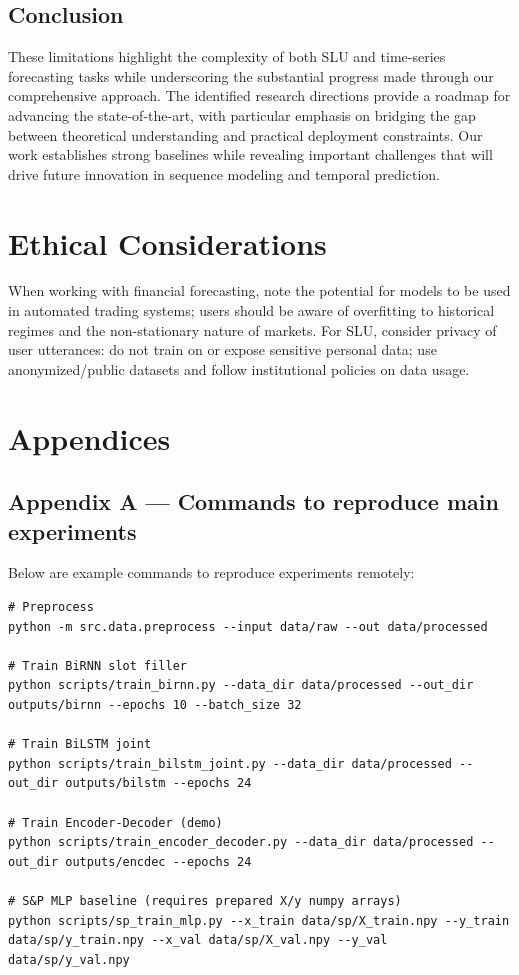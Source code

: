 \documentclass[conference]{IEEEtran}
\begin{document}
\subsection{Conclusion}

These limitations highlight the complexity of both SLU and time-series forecasting tasks while underscoring the substantial progress made through our comprehensive approach. The identified research directions provide a roadmap for advancing the state-of-the-art, with particular emphasis on bridging the gap between theoretical understanding and practical deployment constraints. Our work establishes strong baselines while revealing important challenges that will drive future innovation in sequence modeling and temporal prediction.

\section{Ethical Considerations}
When working with financial forecasting, note the potential for models to be used in automated trading systems; users should be aware of overfitting to historical regimes and the non-stationary nature of markets. For SLU, consider privacy of user utterances: do not train on or expose sensitive personal data; use anonymized/public datasets and follow institutional policies on data usage.

\section{Appendices}
\subsection{Appendix A — Commands to reproduce main experiments}
Below are example commands to reproduce experiments remotely:
\begin{verbatim}
# Preprocess
python -m src.data.preprocess --input data/raw --out data/processed

# Train BiRNN slot filler
python scripts/train_birnn.py --data_dir data/processed --out_dir outputs/birnn --epochs 10 --batch_size 32

# Train BiLSTM joint
python scripts/train_bilstm_joint.py --data_dir data/processed --out_dir outputs/bilstm --epochs 24

# Train Encoder-Decoder (demo)
python scripts/train_encoder_decoder.py --data_dir data/processed --out_dir outputs/encdec --epochs 24

# S&P MLP baseline (requires prepared X/y numpy arrays)
python scripts/sp_train_mlp.py --x_train data/sp/X_train.npy --y_train data/sp/y_train.npy --x_val data/sp/X_val.npy --y_val data/sp/y_val.npy
\end{verbatim}
\end{document}
